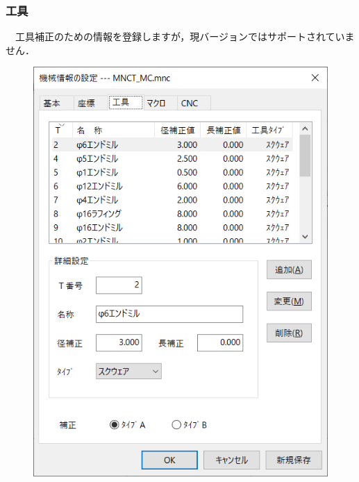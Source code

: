 \subsubsection{工具}
\begin{minipage}[t]{0.5\textwidth}
　工具補正のための情報を登録しますが，現バージョンではサポートされていません．
\end{minipage}
\begin{minipage}[t]{0.5\textwidth}
\vspace*{-2zh}
\begin{figure}[H]
\centering
\includegraphics[scale=0.7]{No6/fig/machine3.png}
\label{fig:machine3.png}
\end{figure}
\end{minipage}

